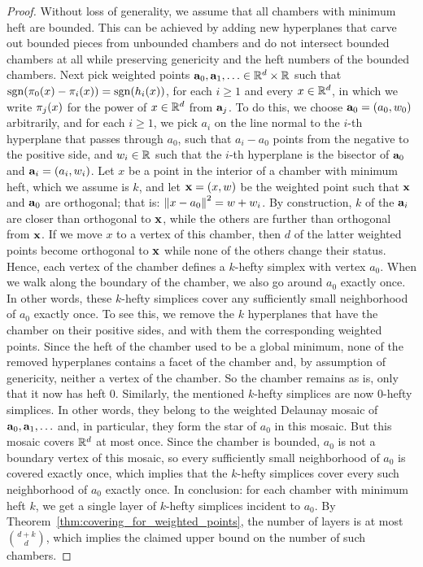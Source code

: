 \documentclass[10pt,a4paper]{article}
\newcommand {\mm}[1] {\ifmmode{#1}\else{\mbox{\(#1\)}}\fi}
\theoremstyle{plain}
\newcommand{\Rspace}        {\mm{{\mathbb R}}}
\newcommand{\aaa}           {\mm{\bf a}}
\newcommand{\xxx}           {\mm{\bf{x}}}
\newcommand{\wdist}[2]      {\mm{\pi_{#1}{({#2})}}}
\newcommand{\sign}[1]       {\mm{\rm sgn}{({#1})}}
\newcommand{\Edist}[2]      {\mm{\|{#1}-{#2}\|}}
\begin{document}
\begin{proof}
  Without loss of generality, we assume that all chambers with minimum heft are bounded. 
  This can be achieved by adding new hyperplanes that carve out bounded pieces from unbounded chambers and do not intersect bounded chambers at all while preserving genericity and the heft numbers of the bounded chambers.
  Next pick weighted points $\aaa_0, \aaa_1, \ldots \in \Rspace^d \times \Rspace$ such that $\sign{\wdist{0}{x} - \wdist{i}{x}} = \sign{h_i(x)}$, for each $i \geq 1$ and every $x \in \Rspace^d$, in which we write $\wdist{j}{x}$ for the power of $x \in \Rspace^d$ from $\aaa_j$.
  To do this, we choose $\aaa_0 = (a_0, w_0)$ arbitrarily, and for each $i \geq 1$, we pick $a_i$ on the line normal to the $i$-th hyperplane that passes through $a_0$, such that $a_i - a_0$ points from the negative to the positive side, and $w_i \in \Rspace$ such that the $i$-th hyperplane is the bisector of $\aaa_0$ and $\aaa_i = (a_i, w_i)$.
  \smallskip
  Let $x$ be a point in the interior of a chamber with minimum heft, which we assume is $k$, and let $\xxx = (x, w)$ be the weighted point such that $\xxx$ and $\aaa_0$ are orthogonal; that is: $\Edist{x}{a_0}^2 = w + w_i$.
  By construction, $k$ of the $\aaa_i$ are closer than orthogonal to $\xxx$, while the others are further than orthogonal from $\xxx$.
  If we move $x$ to a vertex of this chamber, then $d$ of the latter weighted points become orthogonal to $\xxx$ while none of the others change their status.
  Hence, each vertex of the chamber defines a $k$-hefty simplex with vertex $a_0$.
  \smallskip
  When we walk along the boundary of the chamber, we also go around $a_0$ exactly once.
  In other words, these $k$-hefty simplices cover any sufficiently small neighborhood of $a_0$ exactly once.
  To see this, we remove the $k$ hyperplanes that have the chamber on their positive sides, and with them the corresponding weighted points.
  Since the heft of the chamber used to be a global minimum, none of the removed hyperplanes contains a facet of the chamber and, by assumption of genericity, neither a vertex of the chamber.
  So the chamber remains as is, only that it now has heft $0$.
  Similarly, the mentioned $k$-hefty simplices are now $0$-hefty simplices.
  In other words, they belong to the weighted Delaunay mosaic of $\aaa_0, \aaa_1, \ldots$ and, in particular, they form the star of $a_0$ in this mosaic.
  But this mosaic covers $\Rspace^d$ at most once.
  Since the chamber is bounded, $a_0$ is not a boundary vertex of this mosaic, so every sufficiently small neighborhood of $a_0$ is covered exactly once, which implies that the $k$-hefty simplices cover every such neighborhood of $a_0$ exactly once.
  \smallskip
  In conclusion: for each chamber with minimum heft $k$, we get a single layer of $k$-hefty simplices incident to $a_0$.
  By Theorem~\ref{thm:covering_for_weighted_points}, the number of layers is at most $\binom{d+k}{d}$, which implies the claimed upper bound on the number of such chambers.
\end{proof}
\end{document}
